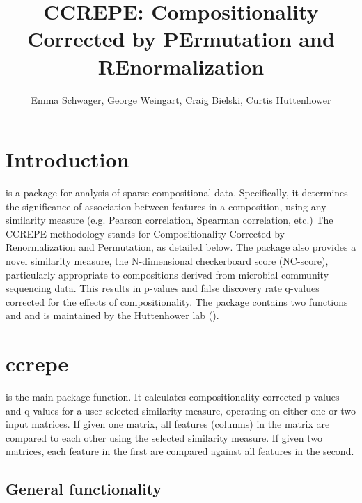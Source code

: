 \documentclass{article}\usepackage[]{graphicx}\usepackage[usenames,dvipsnames]{color}
\title{CCREPE: Compositionality Corrected by PErmutation and REnormalization}
\author{Emma Schwager, George Weingart, Craig Bielski, Curtis Huttenhower}
\begin{document}
\maketitle

\tableofcontents

\section{Introduction}

 is a package for analysis of sparse compositional data.  Specifically, it determines the significance of association between features in a composition, using any similarity measure (e.g. Pearson correlation, Spearman correlation, etc.)  The CCREPE methodology stands for Compositionality Corrected by Renormalization and Permutation, as detailed below.  The package also provides a novel similarity measure, the N-dimensional checkerboard score (NC-score), particularly appropriate to compositions derived from microbial community sequencing data.  This results in p-values and false discovery rate q-values corrected for the effects of compositionality.  The package contains two functions  and  and is maintained by the Huttenhower lab ().

\section{ccrepe} 

 is the main package function.  It calculates compositionality-corrected p-values and q-values for a user-selected similarity measure, operating on either one or two input matrices.  If given one matrix, all features (columns) in the matrix are compared to each other using the selected similarity measure.  If given two matrices, each feature in the first are compared against all features in the second.

\subsection{General functionality}
\end{document}
